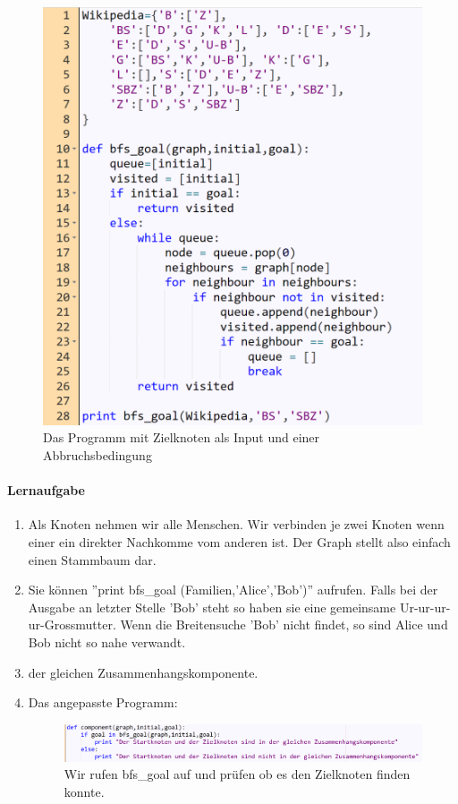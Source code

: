 \begin{figure}[H]
    \centering
    \includegraphics[scale=0.6]{Pictures/WikiProgLoes.PNG}
    \caption{Das Programm mit Zielknoten als Input und einer Abbruchsbedingung}
    \label{fig:my_Prog2Loes}
\end{figure}

\paragraph{Lernaufgabe} 
\begin{enumerate}
    \item Als Knoten nehmen wir alle Menschen. Wir verbinden je zwei Knoten wenn einer ein direkter Nachkomme vom anderen ist. Der Graph stellt also einfach einen Stammbaum dar.
    \item Sie können ''print bfs\_goal (Familien,'Alice','Bob')'' aufrufen. Falls bei der Ausgabe an letzter Stelle 'Bob' steht so haben sie eine gemeinsame Ur-ur-ur-ur-Grossmutter. Wenn die Breitensuche 'Bob' nicht findet, so sind Alice und Bob nicht so nahe verwandt.
    \item der gleichen Zusammenhangskomponente.
    \item Das angepasste Programm:
    \begin{figure}[H]
        \centering
        \includegraphics[scale=0.4]{Pictures/components.PNG}
        \caption{Wir rufen bfs\_goal auf und prüfen ob es den Zielknoten finden konnte.}
        \label{fig:my_components}
    \end{figure}
\end{enumerate}

